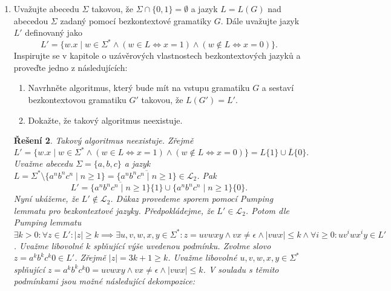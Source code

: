 \documentclass[11pt, a4paper]{article}
\newcommand{\comp}[1]{\overline{#1}}
\theoremstyle{result}
\newtheorem*{result}{Řešení}
\begin{document}
\begin{enumerate}
\begin{result}
\begin{figure}[h]
\begin{tikzpicture}[node distance = 3.7cm, on grid, auto]
        \end{tikzpicture}
        \caption{DZA $M$}
        \end{figure}
    
        Slovo $abaabA$ přijme $M$ následující sekvencí přechodů:
        \begin{multline*}
        (q_s, abaabA, \times) \vdash_M (q_a, baabA, \bullet\times) \vdash_M (q_a, aabA, \times) \vdash_M (q_s, aabA, \times) \vdash_M (q_a, abA, \bullet\times)\\ \vdash_M (q_a, bA, \bullet\bullet\times) \vdash_M (q_a, A, \bullet\times) \vdash_M (q_f, \epsilon, \times)
        \end{multline*}
    \end{result}
    
    
    
    
    
    \item
    Uvažujte abecedu $\Sigma$ takovou, že $\Sigma \cap \{0, 1\} = \emptyset$ a jazyk $L = L(G)$ nad abecedou $\Sigma$ zadaný pomocí bezkontextové gramatiky $G$. Dále uvažujte jazyk $L'$ definovaný jako
    $$L' = \{w.x \mid w \in \Sigma^* \land (w \in L \iff x = 1) \land (w \notin L \iff x = 0)\}.$$
    Inspirujte se v kapitole o uzávěrových vlastnostech bezkontextových jazyků a proveďte jedno z následujících:
    \begin{enumerate}
        \item Navrhněte algoritmus, který bude mít na vstupu gramatiku $G$ a sestaví bezkontextovou gramatiku $G'$ takovou, že $L(G') = L'$.
        \item Dokažte, že takový algoritmus neexistuje.
    \end{enumerate}
    
    
    \begin{result}
        Takový algoritmus neexistuje. Zřejmě
        $$L' = \{w.x \mid w \in \Sigma^* \land (w \in L \iff x = 1) \land (w \notin L \iff x = 0)\} = L\{1\} \cup \comp{L}\{0\}.$$
        Uvažme abecedu $\Sigma = \{a, b, c\}$ a jazyk $L = \Sigma^* \setminus \{a^nb^nc^n \mid n \ge 1\} = \comp{\{a^nb^nc^n \mid n \ge 1\}} \in \mathcal{L}_2$. Pak
        $$L' = \comp{\{a^nb^nc^n \mid n \ge 1\}}\{1\} \cup \{a^nb^nc^n \mid n \ge 1\}\{0\}.$$
        Nyní ukážeme, že $L' \notin \mathcal{L}_2$. Důkaz provedeme sporem pomocí Pumping lemmatu pro bezkontextové jazyky.
        Předpokládejme, že $L' \in \mathcal{L}_2$. Potom dle Pumping lemmatu $\exists k > 0: \forall z \in L': |z| \ge k \implies \exists u, v, w, x, y \in \Sigma^*: z = uvwxy \land vx \neq \epsilon \land |vwx| \leq k \land \forall i \ge 0: uv^iwx^iy \in L'$. Uvažme libovolné $k$ splňující výše uvedenou podmínku. Zvolme slovo $z = a^kb^kc^k0 \in L'$. Zřejmě $|z| = 3k + 1 \ge k$. Uvažme libovolné $u, v, w, x, y \in \Sigma^*$ splňující $z = a^kb^kc^k0 = uvwxy \land vx \neq \epsilon \land |vwx| \leq k$. V souladu s těmito podmínkami jsou možné následující dekompozice:
        

\end{result}
\end{enumerate}
\end{document}
